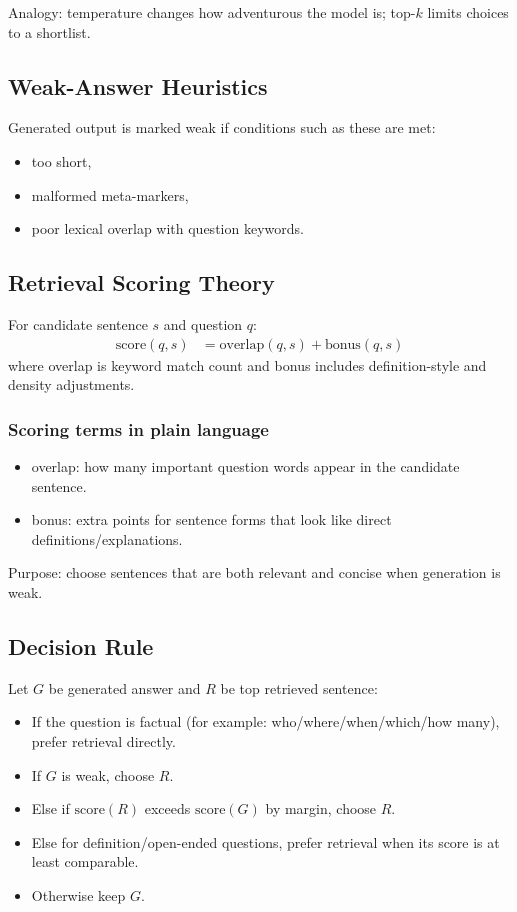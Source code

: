 \documentclass[a4paper,11pt]{article}
\begin{document}
Analogy: temperature changes how adventurous the model is; top-$k$ limits choices to a shortlist.

\subsection{Weak-Answer Heuristics}
Generated output is marked weak if conditions such as these are met:
\begin{itemize}[leftmargin=1.5em]
    \item too short,
    \item malformed meta-markers,
    \item poor lexical overlap with question keywords.
\end{itemize}

\subsection{Retrieval Scoring Theory}
For candidate sentence $s$ and question $q$:
\begin{align*}
\text{score}(q,s) &= \text{overlap}(q,s) + \text{bonus}(q,s)
\end{align*}
where overlap is keyword match count and bonus includes definition-style and density adjustments.

\subsubsection{Scoring terms in plain language}
\begin{itemize}[leftmargin=1.5em]
    \item overlap: how many important question words appear in the candidate sentence.
    \item bonus: extra points for sentence forms that look like direct definitions/explanations.
\end{itemize}

Purpose: choose sentences that are both relevant and concise when generation is weak.

\subsection{Decision Rule}
Let $G$ be generated answer and $R$ be top retrieved sentence:
\begin{itemize}[leftmargin=1.5em]
    \item If the question is factual (for example: who/where/when/which/how many), prefer retrieval directly.
    \item If $G$ is weak, choose $R$.
    \item Else if $\text{score}(R)$ exceeds $\text{score}(G)$ by margin, choose $R$.
    \item Else for definition/open-ended questions, prefer retrieval when its score is at least comparable.
    \item Otherwise keep $G$.
\end{itemize}
\end{document}
